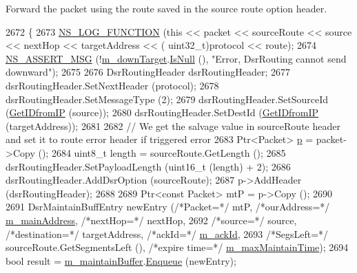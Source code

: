 Forward the packet using the route saved in the source route option header. 


\begin{DoxyCode}
2672 \{
2673   \hyperlink{log-macros-disabled_8h_a90b90d5bad1f39cb1b64923ea94c0761}{NS\_LOG\_FUNCTION} (\textcolor{keyword}{this} << packet << sourceRoute << source << nextHop << targetAddress << (
      uint32\_t)protocol << route);
2674   \hyperlink{assert_8h_aff5ece9066c74e681e74999856f08539}{NS\_ASSERT\_MSG} (!\hyperlink{classns3_1_1dsr_1_1DsrRouting_aa1eb6ea60fdf9ba2cac2079a74ce1ca4}{m\_downTarget}.\hyperlink{classns3_1_1Callback_aa8e27826badbf37f84763f36f70d9b54}{IsNull} (), \textcolor{stringliteral}{"Error, DsrRouting cannot send
       downward"});
2675 
2676   DsrRoutingHeader dsrRoutingHeader;
2677   dsrRoutingHeader.SetNextHeader (protocol);
2678   dsrRoutingHeader.SetMessageType (2);
2679   dsrRoutingHeader.SetSourceId (\hyperlink{classns3_1_1dsr_1_1DsrRouting_a4593e50d5f36e9b9b013fe0422067c44}{GetIDfromIP} (source));
2680   dsrRoutingHeader.SetDestId (\hyperlink{classns3_1_1dsr_1_1DsrRouting_a4593e50d5f36e9b9b013fe0422067c44}{GetIDfromIP} (targetAddress));
2681 
2682   \textcolor{comment}{// We get the salvage value in sourceRoute header and set it to route error header if triggered error}
2683   Ptr<Packet> \hyperlink{lte__link__budget_8m_ac9de518908a968428863f829398a4e62}{p} = packet->Copy ();
2684   uint8\_t length = sourceRoute.GetLength ();
2685   dsrRoutingHeader.SetPayloadLength (uint16\_t (length) + 2);
2686   dsrRoutingHeader.AddDsrOption (sourceRoute);
2687   p->AddHeader (dsrRoutingHeader);
2688 
2689   Ptr<const Packet> mtP = p->Copy ();
2690 
2691   DsrMaintainBuffEntry newEntry (\textcolor{comment}{/*Packet=*/} mtP, \textcolor{comment}{/*ourAddress=*/} \hyperlink{classns3_1_1dsr_1_1DsrRouting_a73182b5edee2d8460f28855e058fc9a0}{m\_mainAddress}, \textcolor{comment}{/*nextHop=*/} 
      nextHop,
2692                               \textcolor{comment}{/*source=*/} source, \textcolor{comment}{/*destination=*/} targetAddress, \textcolor{comment}{/*ackId=*/} 
      \hyperlink{classns3_1_1dsr_1_1DsrRouting_a38c5f8c952141a9853ae9f8ee116e292}{m\_ackId},
2693                               \textcolor{comment}{/*SegsLeft=*/} sourceRoute.GetSegmentsLeft (), \textcolor{comment}{/*expire time=*/} 
      \hyperlink{classns3_1_1dsr_1_1DsrRouting_ac6b1dffa9665af0d6a71aa7b947962ee}{m\_maxMaintainTime});
2694   \textcolor{keywordtype}{bool} result = \hyperlink{classns3_1_1dsr_1_1DsrRouting_ac9d28a64437fbe20a4228c9811f9fc27}{m\_maintainBuffer}.\hyperlink{classns3_1_1dsr_1_1DsrMaintainBuffer_a8ec30b5b9b0f6af36e61867327a47717}{Enqueue} (newEntry);

\end{DoxyCode}
